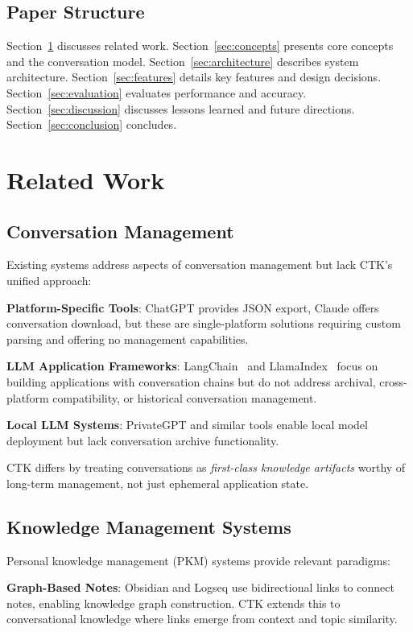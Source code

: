 \documentclass[11pt,letterpaper]{article}
\begin{document}
\subsection{Paper Structure}

Section~\ref{sec:related} discusses related work. Section~\ref{sec:concepts} presents core concepts and the conversation model. Section~\ref{sec:architecture} describes system architecture. Section~\ref{sec:features} details key features and design decisions. Section~\ref{sec:evaluation} evaluates performance and accuracy. Section~\ref{sec:discussion} discusses lessons learned and future directions. Section~\ref{sec:conclusion} concludes.

\section{Related Work}
\label{sec:related}

\subsection{Conversation Management}

Existing systems address aspects of conversation management but lack CTK's unified approach:

\textbf{Platform-Specific Tools}: ChatGPT provides JSON export, Claude offers conversation download, but these are single-platform solutions requiring custom parsing and offering no management capabilities.

\textbf{LLM Application Frameworks}: LangChain~\cite{langchain} and LlamaIndex~\cite{llamaindex} focus on building applications with conversation chains but do not address archival, cross-platform compatibility, or historical conversation management.

\textbf{Local LLM Systems}: PrivateGPT and similar tools enable local model deployment but lack conversation archive functionality.

CTK differs by treating conversations as \emph{first-class knowledge artifacts} worthy of long-term management, not just ephemeral application state.

\subsection{Knowledge Management Systems}

Personal knowledge management (PKM) systems provide relevant paradigms:

\textbf{Graph-Based Notes}: Obsidian and Logseq use bidirectional links to connect notes, enabling knowledge graph construction. CTK extends this to conversational knowledge where links emerge from context and topic similarity.
\end{document}
